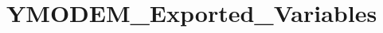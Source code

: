 \hypertarget{group___y_m_o_d_e_m___exported___variables}{}\section{Y\+M\+O\+D\+E\+M\+\_\+\+Exported\+\_\+\+Variables}
\label{group___y_m_o_d_e_m___exported___variables}
